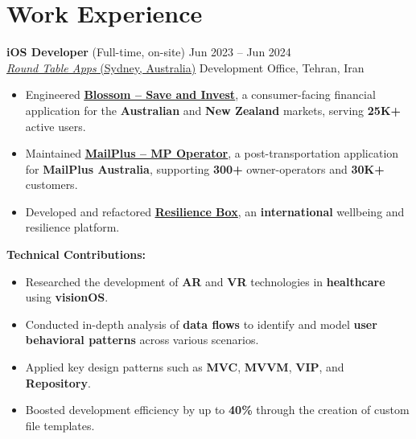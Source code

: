 \documentclass[letter,10pt]{article}
\newcommand{\customsquare}{\raisebox{0.25ex}{\scalebox{0.45}{$\blacksquare$}}}
\begin{document}
\section*{Work Experience}
\textbf{iOS Developer} (Full-time, on-site) \hfill Jun 2023 -- Jun 2024 \\
\href{https://roundtableapps.com}{\underline{\textit{Round Table Apps} (Sydney, Australia)}} \hfill Development Office, Tehran, Iran \\ [-10pt]
\begin{itemize}[label={\customsquare}]
    \item Engineered \href{https://www.blossomapp.com}{\underline{\textbf{Blossom -- Save and Invest}}}, a consumer-facing financial application for the \textbf{Australian} and \textbf{New Zealand} markets, serving \textbf{25K+} active users.
    \item Maintained \href{https://mailplus.com.au}{\underline{\textbf{MailPlus -- MP Operator}}}, a post-transportation application for \textbf{MailPlus Australia}, supporting \textbf{300+} owner-operators and \textbf{30K+} customers.
    \item Developed and refactored \href{https://app.resiliencebox.com}{\underline{\textbf{Resilience Box}}}, an \textbf{international} wellbeing and resilience platform.
\end{itemize}
\textbf{Technical Contributions:}
\begin{itemize}[label={\customsquare}]
    \item Researched the development of \textbf{AR} and \textbf{VR} technologies in \textbf{healthcare} using \textbf{visionOS}.
    \item Conducted in-depth analysis of \textbf{data flows} to identify and model \textbf{user behavioral patterns} across various scenarios.
    \item Applied key design patterns such as \textbf{MVC}, \textbf{MVVM}, \textbf{VIP}, and \textbf{Repository}.
    \item Boosted development efficiency by up to \textbf{40\%} through the creation of custom file templates.
\end{itemize}

\end{document}
